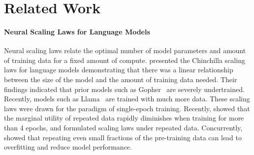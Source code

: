 \documentclass[table]{article}
\begin{document}
\section{Related Work}
\paragraph{Neural Scaling Laws for Language Models}
Neural scaling laws relate the optimal number of model parameters and amount of training data for a fixed amount of compute.  \citet{hoffmann2022training} presented the Chinchilla scaling laws for language models demonstrating that there was a linear relationship between the size of the model and the amount of training data needed. Their findings indicated that prior models such as Gopher~\citep{rae2021scaling} are severely undertrained. Recently, models such as Llama~\citep{touvron2023llama} are trained with much more data.  These scaling laws were drawn for the paradigm of single-epoch training.  Recently, \citet{muennighoff2023scaling} showed that
the marginal utility of repeated data rapidly diminishes when training for more than 4 epochs, and formulated scaling laws under repeated data.
Concurrently, \citet{xue2023repeat} showed that repeating even small fractions of the pre-training data can lead to overfitting and reduce model performance.
\end{document}
